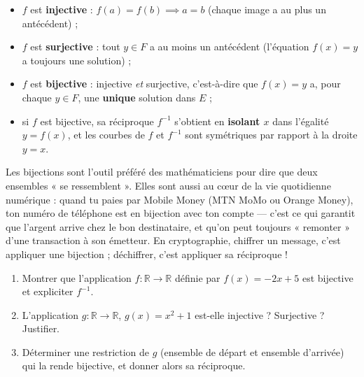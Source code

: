 \documentclass[11pt]{article}
\begin{document}
\begin{aretenir}
\begin{itemize}
\item $f$ est \textbf{injective} : $f(a) = f(b) \implies a = b$ (chaque image a au plus un antécédent) ;
\item $f$ est \textbf{surjective} : tout $y \in F$ a au moins un antécédent (l'équation $f(x) = y$ a toujours une solution) ;
\item $f$ est \textbf{bijective} : injective \emph{et} surjective, c'est-à-dire que $f(x) = y$ a, pour chaque $y \in F$, une \textbf{unique} solution dans $E$ ;
\item si $f$ est bijective, sa réciproque $f^{-1}$ s'obtient en \textbf{isolant $x$} dans l'égalité $y = f(x)$, et les courbes de $f$ et $f^{-1}$ sont symétriques par rapport à la droite $y = x$.
\end{itemize}
\end{aretenir}

\begin{savaistu}
Les bijections sont l'outil préféré des mathématiciens pour dire que deux ensembles « se ressemblent ». Elles sont aussi au cœur de la vie quotidienne numérique : quand tu paies par Mobile Money (MTN MoMo ou Orange Money), ton numéro de téléphone est en bijection avec ton compte — c'est ce qui garantit que l'argent arrive chez le bon destinataire, et qu'on peut toujours « remonter » d'une transaction à son émetteur. En cryptographie, chiffrer un message, c'est appliquer une bijection ; déchiffrer, c'est appliquer sa réciproque !
\end{savaistu}

\begin{exercice}
\begin{enumerate}
\item Montrer que l'application $f : \mathbb{R} \to \mathbb{R}$ définie par $f(x) = -2x + 5$ est bijective et expliciter $f^{-1}$.
\item L'application $g : \mathbb{R} \to \mathbb{R}$, $g(x) = x^2 + 1$ est-elle injective ? Surjective ? Justifier.
\item Déterminer une restriction de $g$ (ensemble de départ et ensemble d'arrivée) qui la rende bijective, et donner alors sa réciproque.
\end{enumerate}
\end{exercice}
\end{document}
